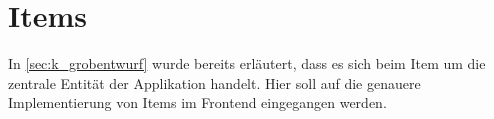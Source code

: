 \section{Items}
\label{sec:f_items}

In \cref{sec:k_grobentwurf} wurde bereits erläutert, dass es sich beim Item um
die zentrale Entität der Applikation handelt.  Hier soll auf die genauere
Implementierung von Items im Frontend eingegangen werden.



